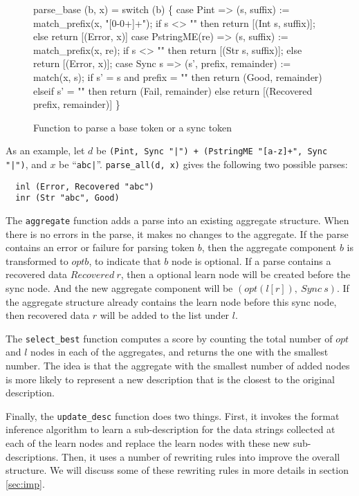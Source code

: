 \begin{figure}[t]
\begin{codebox}
parse_base (b, x) =
  switch (b) \{
  case Pint => 
    (s, suffix) := match_prefix(x, "[0-0+\-]+");
    if s <> "" then return [(Int s, suffix)];
    else return [(Error, x)]
  case PstringME(re) => 
    (s, suffix) := match_prefix(x, re);
    if s <> "" then return [(Str s, suffix)];
    else return [(Error, x)];
  case Sync s => 
    (s', prefix, remainder) := match(x, s);
    if s' = s and prefix = "" then 
      return (Good, remainder)
    elseif s' = "" then 
      return (Fail, remainder)
    else return [(Recovered prefix, remainder)]
  \}
\end{codebox}
\caption{Function to parse a base token or a sync token} \label{fig:parse_base}
\end{figure}

As an example, let $d$ be {\tt (Pint, Sync "|") + (PstringME "[a-z]+", Sync "|")}, 
and $x$ be ``\verb#abc|#''. {\tt parse\_all(d, x)} gives the following two possible parses:
{\small
\begin{verbatim}
  inl (Error, Recovered "abc")
  inr (Str "abc", Good)
\end{verbatim}
}

The {\tt aggregate} function adds a parse into an existing aggregate structure. When there is
no errors in the parse, it makes no changes to the aggregate. If the parse contains 
an error or failure for parsing token $b$, then the aggregate component 
$b$ is transformed to $opt b$, to indicate that $b$ node is optional. 
If a parse contains a recovered data $Recovered~ r$, then
a optional learn node will be created before the sync node. And the new aggregate component will be
$(opt (l [r]),~ Sync~ s)$. If the aggregate structure already contains the learn node before this
sync node, then recovered data $r$ will be added to the list under $l$.

The {\tt select\_best} function computes a score by counting the total number of $opt$ and $l$ nodes
in each of the aggregates, and returns the one with the smallest number. The idea is that the
aggregate with the smallest number of added nodes is more likely to represent a new description
that is the closest to the original description. 

Finally, the {\tt update\_desc} function does two things. First, it invokes the format inference
algorithm to learn a sub-description for the data strings collected at each of the learn nodes
and replace the learn nodes with these new sub-descriptions. Then, it uses a number of rewriting
rules into improve the overall structure. We will discuss some of these rewriting rules in more
details in section \ref{sec:imp}.



